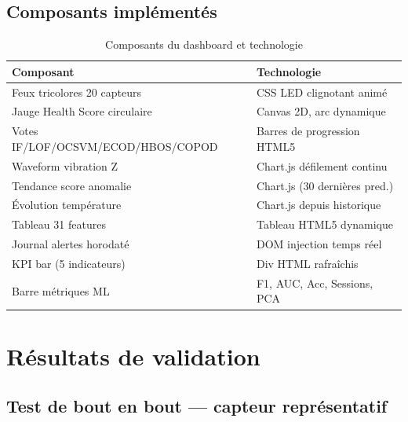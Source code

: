 \documentclass[12pt,a4paper]{report}
\begin{document}
\subsection{Composants implémentés}

\begin{table}[h]
\centering
\caption{Composants du dashboard et technologie}
\begin{tabular}{ll}
\toprule
\textbf{Composant} & \textbf{Technologie} \\
\midrule
Feux tricolores 20 capteurs    & CSS LED clignotant animé \\
Jauge Health Score circulaire  & Canvas 2D, arc dynamique \\
Votes IF/LOF/OCSVM/ECOD/HBOS/COPOD & Barres de progression HTML5 \\
Waveform vibration Z           & Chart.js défilement continu \\
Tendance score anomalie        & Chart.js (30 dernières pred.) \\
Évolution température          & Chart.js depuis historique \\
Tableau 31 features            & Tableau HTML5 dynamique \\
Journal alertes horodaté       & DOM injection temps réel \\
KPI bar (5 indicateurs)        & Div HTML rafraîchis \\
Barre métriques ML             & F1, AUC, Acc, Sessions, PCA \\
\bottomrule
\end{tabular}
\end{table}

\section{Résultats de validation}

\subsection{Test de bout en bout — capteur représentatif}
\end{document}
